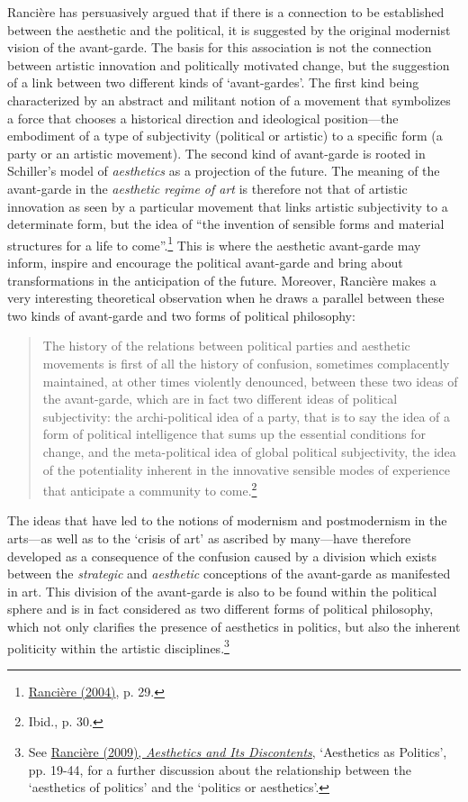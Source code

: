 Ranci\`{e}re has persuasively argued that if there is a connection to be established between the aesthetic and the political, it is suggested by the original modernist vision of the avant-garde.  The basis for this association is not the connection between artistic innovation and politically motivated change, but the suggestion of a link between two different kinds of `avant-gardes'. The first kind being characterized by an abstract and militant notion of a movement that symbolizes a force that chooses a historical direction and ideological position---the embodiment of a type of subjectivity (political or artistic) to a specific form (a party or an artistic movement). The second kind of avant-garde is rooted in Schiller's model of \emph{aesthetics} as a projection of the future. The meaning of the avant-garde in the \emph{aesthetic regime of art} is therefore not that of artistic innovation as seen by a particular movement that links artistic subjectivity to a determinate form, but the idea of ``the invention of sensible forms and material structures for a life to come''.\footnote{\hyperlink{ranpoli}{Ranci\`{e}re (2004)}, p. 29.} This is where the aesthetic avant-garde may inform, inspire and encourage the political avant-garde and bring about transformations in the anticipation of the future. Moreover, Ranci\`{e}re makes a very interesting theoretical observation when he draws a parallel between these two kinds of avant-garde and two forms of political philosophy:
\begin{quote}
The history of the relations between political parties and aesthetic movements is first of all the history of confusion, sometimes complacently maintained, at other times violently denounced, between these two ideas of the avant-garde, which are in fact two different ideas of political subjectivity: the archi-political idea of a party, that is to say the idea of a form of political intelligence that sums up the essential conditions for change, and the meta-political idea of global political subjectivity, the idea of the potentiality inherent in the innovative sensible modes of experience that anticipate a community to come.\footnote{Ibid., p. 30.}
\end{quote}

The ideas that have led to the notions of modernism and postmodernism in the arts---as well as to the `crisis of art' as ascribed by many---have therefore developed as a consequence of the confusion caused by a division which exists between the \emph{strategic} and \emph{aesthetic} conceptions of the avant-garde as manifested in art. This division of the avant-garde is also to be found within the political sphere and is in fact considered as two different forms of political philosophy, which not only clarifies the presence of aesthetics in politics, but also the inherent politicity within the artistic disciplines.\footnote{See \hyperlink{ranaesth}{Ranci\`{e}re (2009), \emph{Aesthetics and Its Discontents}}, `Aesthetics as Politics', pp. 19-44, for a further discussion about the relationship between the `aesthetics of politics' and the `politics or aesthetics'.}


